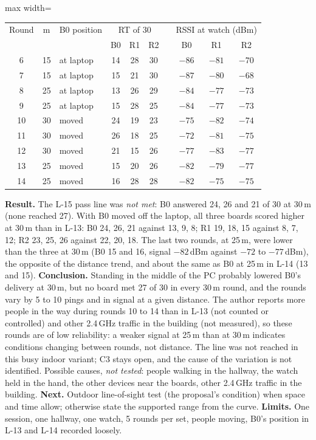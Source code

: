 \IfFileExists{IEEEtran.cls}{\documentclass[conference]{IEEEtran}}{\documentclass[10pt,twocolumn]{article}}
\newcommand{\fitcol}[1]{\begin{adjustbox}{max width=\columnwidth}#1\end{adjustbox}}
\begin{document}
\begin{center}\footnotesize\setlength{\tabcolsep}{4pt}
\fitcol{\begin{tabular}{@{}c c l ccc c ccc@{}}
\toprule
Round & m & B0 position & \multicolumn{3}{c}{RT of 30} & & \multicolumn{3}{c}{RSSI at watch (dBm)}\\
 & & & B0 & R1 & R2 & & B0 & R1 & R2\\
\midrule
6 & 15 & at laptop & 14 & 28 & 30 & & $-86$ & $-81$ & $-70$\\
7 & 15 & at laptop & 15 & 21 & 30 & & $-87$ & $-80$ & $-68$\\
8 & 25 & at laptop & 13 & 26 & 29 & & $-84$ & $-77$ & $-73$\\
9 & 25 & at laptop & 15 & 28 & 25 & & $-84$ & $-77$ & $-73$\\
\midrule
10 & 30 & moved & 24 & 19 & 23 & & $-75$ & $-82$ & $-74$\\
11 & 30 & moved & 26 & 18 & 25 & & $-72$ & $-81$ & $-75$\\
12 & 30 & moved & 21 & 15 & 26 & & $-77$ & $-83$ & $-77$\\
13 & 25 & moved & 15 & 20 & 26 & & $-82$ & $-79$ & $-77$\\
14 & 25 & moved & 16 & 28 & 28 & & $-82$ & $-75$ & $-75$\\
\bottomrule
\end{tabular}}
\end{center}
\textbf{Result.} The L-15 pass line was \emph{not met}: B0 answered 24, 26 and 21 of 30 at 30\,m (none reached 27). With B0 moved off the laptop, all three boards scored higher at 30\,m than in L-13: B0 24, 26, 21 against 13, 9, 8; R1 19, 18, 15 against 8, 7, 12; R2 23, 25, 26 against 22, 20, 18. The last two rounds, at 25\,m, were lower than the three at 30\,m (B0 15 and 16, signal $-82$\,dBm against $-72$ to $-77$\,dBm), the opposite of the distance trend, and about the same as B0 at 25\,m in L-14 (13 and 15). \textbf{Conclusion.} Standing in the middle of the PC probably lowered B0's delivery at 30\,m, but no board met 27 of 30 in every 30\,m round, and the rounds vary by 5 to 10 pings and in signal at a given distance. The author reports more people in the way during rounds 10 to 14 than in L-13 (not counted or controlled) and other 2.4\,GHz traffic in the building (not measured), so these rounds are of low reliability: a weaker signal at 25\,m than at 30\,m indicates conditions changing between rounds, not distance. The line was not reached in this busy indoor variant; C3 stays open, and the cause of the variation is not identified. Possible causes, \emph{not tested}: people walking in the hallway, the watch held in the hand, the other devices near the boards, other 2.4\,GHz traffic in the building. \textbf{Next.} Outdoor line-of-sight test (the proposal's condition) when space and time allow; otherwise state the supported range from the curve. \textbf{Limits.} One session, one hallway, one watch, 5 rounds per set, people moving, B0's position in L-13 and L-14 recorded loosely.
\end{document}
